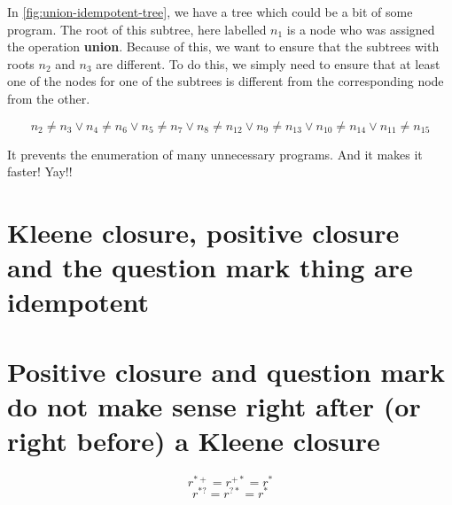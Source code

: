 

In \autoref{fig:union-idempotent-tree}, we have a tree which could be a bit of some program. The root of this subtree, here labelled \(n_1\) is a node who was assigned the operation \textbf{union}. Because of this, we want to ensure that the subtrees with roots \(n_2\) and \(n_3\) are different. To do this, we simply need to ensure that at least one of the nodes for one of the subtrees is different from the corresponding node from the other.

\[n_2 \ne n_3 \lor n_4 \ne n_6 \lor n_5 \ne n_7 \lor n_8 \ne n_{12} \lor n_9 \ne n_{13} \lor n_{10} \ne n_{14} \lor n_{11} \ne n_{15}\]

It prevents the enumeration of many unnecessary programs. And it makes it faster! Yay!!

\section{Kleene closure, positive closure and the question mark thing are idempotent}

\section{Positive closure and question mark do not make sense right after (or right before) a Kleene closure}

\[r^{*+} = r^{+*} = r^*\]
%
\[r^{*?} = r^{?*} = r^*\]
